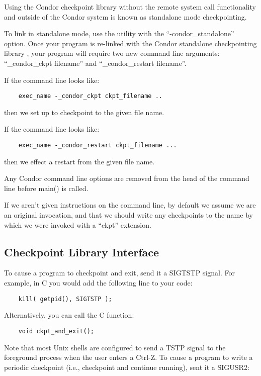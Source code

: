 Using the Condor checkpoint library without the remote system call
functionality and outside of the Condor system is known as standalone
mode checkpointing.

To link in standalone mode, use the  utility with the
``-condor\_standalone'' option.
Once your program is re-linked with the Condor standalone
checkpointing library , your program will
require two new command line arguments: ``\_condor\_ckpt filename''
and ``\_condor\_restart filename''.

If the command line looks like:

\begin{verbatim}
	exec_name -_condor_ckpt ckpt_filename ..
\end{verbatim}

then we set up to checkpoint to the given file name.

If the command line looks like:

\begin{verbatim}
	exec_name -_condor_restart ckpt_filename ...
\end{verbatim}

then we effect a restart from the given file name.

Any Condor command line options are removed from the head of the
command line before main() is called.

If we aren't given instructions on the command line, by default we
assume we are an original invocation, and that we should write any
checkpoints to the name by which we were invoked with a
``ckpt'' extension.

\subsection{\label{sec:ckpt-api}Checkpoint Library Interface}

To cause a program to checkpoint and exit, send it a SIGTSTP signal.  For 
example, in C you would add the following line to your code:

\begin{verbatim}
	kill( getpid(), SIGTSTP );
\end{verbatim}

Alternatively, you can call the C function:

\begin{verbatim}
	void ckpt_and_exit();
\end{verbatim}

Note that most Unix shells are configured to send a TSTP signal to the
foreground process when the user enters a Ctrl-Z.  To cause a program
to write a periodic checkpoint (i.e., checkpoint and continue
running), sent it a SIGUSR2:

